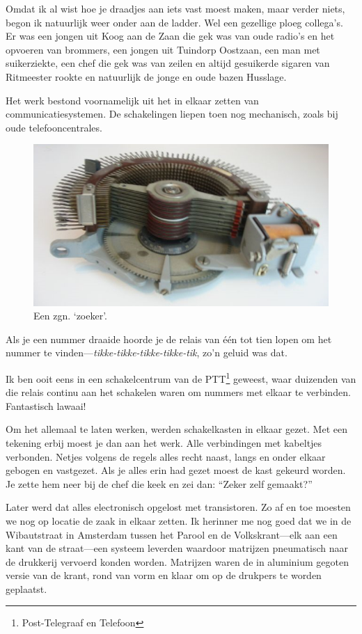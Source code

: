 \documentclass[12pt,twoside, openright]{memoir}
\begin{document}
Omdat ik al wist hoe je draadjes aan iets vast moest maken, maar verder niets, begon ik natuurlijk weer onder aan de ladder. Wel een gezellige ploeg collega’s. Er was een jongen uit Koog aan de Zaan die gek was van oude radio’s en het opvoeren van brommers, een jongen uit Tuindorp Oostzaan, een man met suikerziekte, een chef die gek was van zeilen en altijd gesuikerde sigaren van Ritmeester rookte en natuurlijk de jonge en oude bazen Husslage. 

Het werk bestond voornamelijk uit het in elkaar zetten van communicatiesystemen. De schakelingen liepen toen nog mechanisch, zoals bij oude telefooncentrales. 

\begin{figure}
\includegraphics[width=\textwidth]{img/ch32/image-4}
\caption*{\footnotesize Een zgn. ‘zoeker’.}
\end{figure}

Als je een nummer draaide hoorde je de relais van één tot tien lopen om het nummer te vinden---\emph{tikke-tikke-tikke-tikke-tik}, zo’n geluid was dat. 

Ik ben ooit eens in een schakelcentrum van de PTT\footnote{Post-Telegraaf en Telefoon} geweest, waar duizenden van die relais continu aan het schakelen waren om nummers met elkaar te verbinden. Fantastisch lawaai! 

Om het allemaal te laten werken, werden schakelkasten in elkaar gezet. Met een tekening erbij moest je dan aan het werk. Alle verbindingen met kabeltjes verbonden. Netjes volgens de regels alles recht naast, langs en onder elkaar gebogen en vastgezet. Als je alles erin had gezet moest de kast gekeurd worden. Je zette hem neer bij de chef die keek en zei dan: ``Zeker zelf gemaakt?''

Later werd dat alles electronisch opgelost met transistoren. Zo af en toe moesten we nog op locatie de zaak in elkaar zetten. Ik herinner me nog goed dat we in de Wibautstraat in Amsterdam tussen het Parool en de Volkskrant---elk aan een kant van de straat---een systeem leverden waardoor matrijzen pneumatisch naar de drukkerij vervoerd konden worden. Matrijzen waren de in aluminium gegoten versie van de krant, rond van vorm en klaar om op de drukpers te worden geplaatst. 
\end{document}
